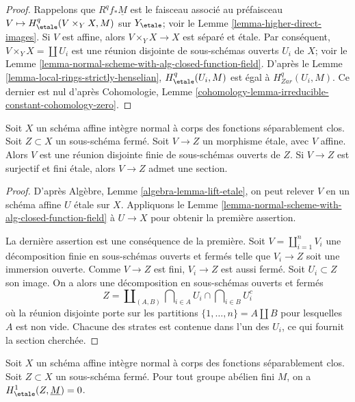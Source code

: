 \begin{proof}
Rappelons que $R^qf_*\underline{M}$ est le faisceau associé
au préfaisceau $V \mapsto H^q_\etale(V \times_Y X, M)$ sur $Y_\etale$; voir le
Lemme \ref{lemma-higher-direct-images}.
Si $V$ est affine, alors $V \times_Y X \to X$ est séparé et étale.
Par conséquent, $V \times_Y X = \coprod U_i$ est une réunion disjointe de
sous-schémas ouverts $U_i$ de $X$; voir le
Lemme \ref{lemma-normal-scheme-with-alg-closed-function-field}.
D'après le Lemme \ref{lemma-local-rings-strictly-henselian},
$H^q_\etale(U_i, M)$ est égal à
$H^q_{Zar}(U_i, M)$. Ce dernier est nul d'après
Cohomologie, Lemme \ref{cohomology-lemma-irreducible-constant-cohomology-zero}.
\end{proof}

\begin{lemma}
\label{lemma-closed-of-affine-normal-scheme-with-alg-closed-function-field}
Soit $X$ un schéma affine intègre normal à corps des fonctions
séparablement clos. Soit $Z \subset X$ un sous-schéma fermé. Soit
$V \to Z$ un morphisme étale, avec $V$ affine. Alors $V$ est une réunion
disjointe finie de sous-schémas ouverts de $Z$. Si $V \to Z$ est
surjectif et fini étale, alors $V \to Z$ admet une section.
\end{lemma}

\begin{proof}
D'après Algèbre, Lemme \ref{algebra-lemma-lift-etale},
on peut relever $V$ en un schéma affine $U$ étale sur $X$.
Appliquons le Lemme \ref{lemma-normal-scheme-with-alg-closed-function-field}
à $U \to X$ pour obtenir la première assertion.

\medskip\noindent
La dernière assertion est une conséquence de la première.
Soit $V = \coprod_{i=1}^n V_i$ une décomposition finie
en sous-schémas ouverts et
fermés telle que $V_i \to Z$ soit une immersion ouverte.
Comme $V \to Z$ est fini, $V_i \to Z$ est aussi fermé.
Soit $U_i \subset Z$ son image. On a alors une décomposition
en sous-schémas ouverts et fermés
$$
Z =
\coprod\nolimits_{(A, B)}
\bigcap\nolimits_{i \in A} U_i \cap
\bigcap\nolimits_{i \in B} U_i^c
$$
où la réunion disjointe porte sur les partitions $\{1, \ldots, n\} = A \amalg B$
pour lesquelles $A$ est non vide.
Chacune des strates est contenue dans l'un des $U_i$, ce qui
fournit la section cherchée.
\end{proof}

\begin{lemma}
\label{lemma-gabber-for-h1-absolutely-algebraically-closed}
Soit $X$ un schéma affine intègre normal à corps des fonctions
séparablement clos. Soit $Z \subset X$ un sous-schéma fermé.
Pour tout groupe abélien fini $M$, on a $H^1_\etale(Z, \underline{M}) = 0$.
\end{lemma}

